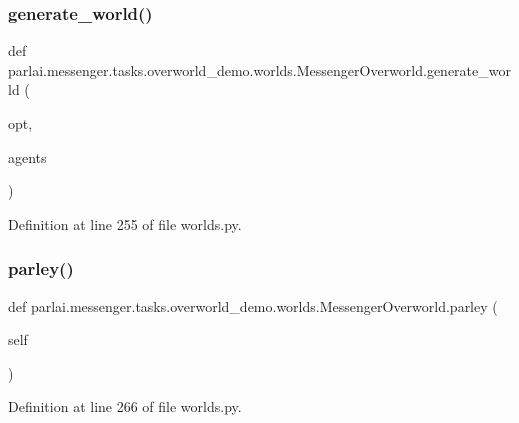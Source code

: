 \subsubsection{\texorpdfstring{generate\+\_\+world()}{generate\_world()}}
{\footnotesize\ttfamily def parlai.\+messenger.\+tasks.\+overworld\+\_\+demo.\+worlds.\+Messenger\+Overworld.\+generate\+\_\+world (\begin{DoxyParamCaption}\item[{}]{opt,  }\item[{}]{agents }\end{DoxyParamCaption})\hspace{0.3cm}{\ttfamily [static]}}



Definition at line 255 of file worlds.\+py.

\mbox{\label{classparlai_1_1messenger_1_1tasks_1_1overworld__demo_1_1worlds_1_1MessengerOverworld_ac318d319390b9bd5ba22af6aca529317}} 
\subsubsection{\texorpdfstring{parley()}{parley()}}
{\footnotesize\ttfamily def parlai.\+messenger.\+tasks.\+overworld\+\_\+demo.\+worlds.\+Messenger\+Overworld.\+parley (\begin{DoxyParamCaption}\item[{}]{self }\end{DoxyParamCaption})}



Definition at line 266 of file worlds.\+py.



